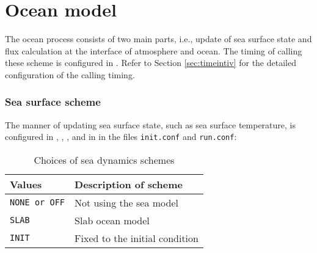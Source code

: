 \section{Ocean model} \label{sec:basic_usel_ocean}
The ocean process consists of two main parts, i.e., update of sea surface state and flux calculation at the interface of atmosphere and ocean. The timing of calling these scheme is configured in . Refer to Section \ref{sec:timeintiv} for the detailed configuration of the calling timing.

\subsubsection{Sea surface scheme}
The manner of updating sea surface state, such as sea surface temperature, is configured in , , , and  in  in the files \verb|init.conf| and \verb|run.conf|:


\begin{table}[h]
\begin{center}
  \caption{Choices of sea dynamics schemes}
  \label{tab:nml_ocean_dyn}
  \begin{tabularx}{150mm}{lX} \hline
    \rowcolor[gray]{0.9}  Values & Description of scheme \\ \hline
      \verb|NONE or OFF| & Not using the sea model \\
      \verb|SLAB|        & Slab ocean model \\
      \verb|INIT|        & Fixed to the initial condition \\
    \hline
  \end{tabularx}
\end{center}
\end{table}

